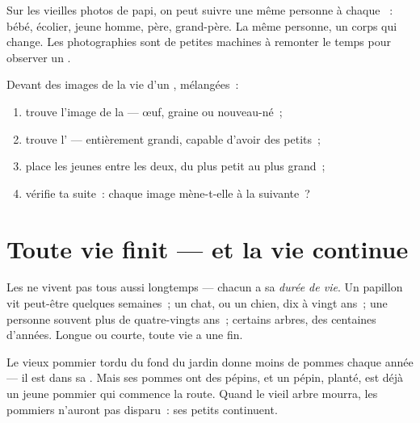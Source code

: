 \begin{example}\label{ex:g2:born-grow-die:photo}
Sur les vieilles photos de papi, on peut suivre une même personne à
chaque ~: bébé, écolier, jeune homme, père, grand-père. La même
personne, un corps qui change. Les photographies sont de petites
machines à remonter le temps pour observer un .
\end{example}

\begin{method}\label{met:g2:born-grow-die:order}
Devant des images de la vie d'un , mélangées~:
\begin{enumerate}
  \item trouve l'image de la  --- œuf, graine ou
        nouveau-né~;
  \item trouve l' --- entièrement grandi, capable d'avoir des
        petits~;
  \item place les jeunes entre les deux, du plus petit au plus
        grand~;
  \item vérifie ta suite~: chaque image mène-t-elle à la suivante~?
\end{enumerate}
\end{method}

\section{Toute vie finit --- et la vie continue}

\begin{proposition}\label{prop:g2:born-grow-die:lifespan}
Les  ne vivent pas tous aussi longtemps --- chacun a sa
\emph{durée de vie}. Un papillon vit peut-être
quelques semaines~; un chat, ou un chien, dix à vingt ans~; une
personne souvent plus de quatre-vingts ans~; certains arbres, des
centaines d'années. Longue ou courte, toute vie a une fin.
\end{proposition}
\admitted

\begin{example}\label{ex:g2:born-grow-die:oldtree}
Le vieux pommier tordu du fond du jardin donne moins de pommes
chaque année --- il est dans sa . Mais ses pommes ont des
pépins, et un pépin, planté, est déjà un jeune pommier qui commence
la route. Quand le vieil arbre mourra, les pommiers n'auront pas
disparu~: ses petits continuent.
\end{example}

